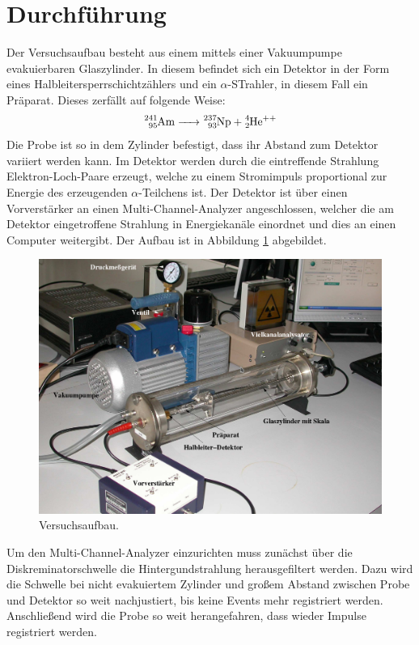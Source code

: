 \section{Durchführung}
\label{sec:Durchführung}
Der Versuchsaufbau besteht aus einem mittels einer Vakuumpumpe evakuierbaren Glaszylinder. In diesem befindet sich ein Detektor in der Form eines Halbleitersperrschichtzählers und ein $\alpha$-STrahler, in 
diesem Fall ein  Präparat. Dieses zerfällt auf folgende Weise:
\begin{equation}
	\ce{^{241}_{95}Am -> ^{237}_{93}Np + ^4_2He^{++}}
\end{equation}
Die Probe ist so in dem Zylinder befestigt, dass ihr Abstand zum Detektor variiert werden kann.
Im Detektor werden durch die eintreffende Strahlung Elektron-Loch-Paare erzeugt, welche zu einem Stromimpuls proportional zur Energie des erzeugenden $\alpha$-Teilchens ist.
Der Detektor ist über einen Vorverstärker an einen Multi-Channel-Analyzer angeschlossen, welcher die am Detektor eingetroffene Strahlung in Energiekanäle einordnet und dies an einen Computer weitergibt.
Der Aufbau ist in Abbildung \ref{fig:aufbau} abgebildet.
\begin{figure}[H]
  \centering
  \includegraphics[width=\textwidth]{content/aufbau.png}
  \caption{Versuchsaufbau.}
  \label{fig:aufbau}
\end{figure}
\noindent
Um den Multi-Channel-Analyzer einzurichten muss zunächst über die Diskreminatorschwelle die Hintergundstrahlung herausgefiltert werden. Dazu wird die Schwelle bei nicht evakuiertem Zylinder und großem 
Abstand zwischen Probe und Detektor so weit nachjustiert, bis keine Events mehr registriert werden. Anschließend wird die Probe so weit herangefahren, dass wieder Impulse registriert werden.
